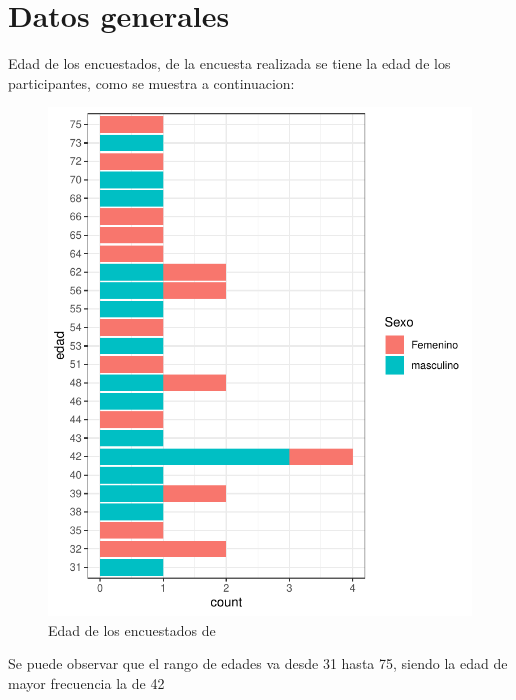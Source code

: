 \documentclass[12pt]{article}\usepackage[]{graphicx}\usepackage[]{xcolor}
\makeatletter
\def\maxwidth{ %
  \ifdim\Gin@nat@width>\linewidth
    \linewidth
  \else
    \Gin@nat@width
  \fi
}
\newenvironment{knitrout}{}{} %
\makeatother
\begin{document}
	\section{Datos generales}
	Edad de los encuestados, de la encuesta realizada se tiene la edad de los participantes, como se muestra a continuacion:
	\begin{figure}[H]
	\centering
\begin{knitrout}
\color{fgcolor}
\includegraphics[width=\maxwidth]{figure/dos-1} 
\end{knitrout}
             	
	\caption{Edad de los encuestados de \comunidad}
	\end{figure}
	
	
	
	Se puede observar que el rango de edades va desde 31 hasta 75, siendo la edad de mayor frecuencia la de 42
\end{document}
